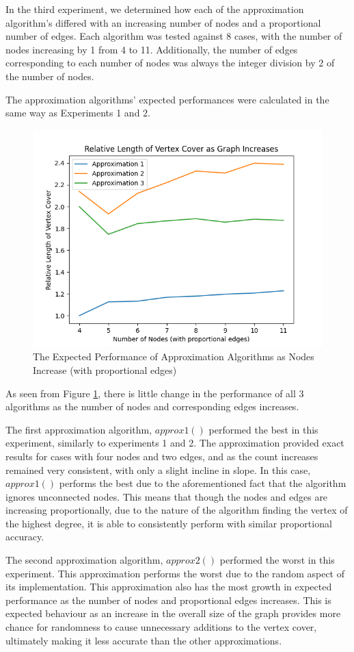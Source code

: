 \documentclass[titlepage]{article}
\begin{document}
In the third experiment, we determined how each of the approximation algorithm's differed with an increasing number of nodes and a proportional number of edges. Each algorithm was tested against 8 cases, with the number of nodes increasing by 1 from 4 to 11. Additionally, the number of edges corresponding to each number of nodes was always the integer division by 2 of the number of nodes.

The approximation algorithms' expected performances were calculated in the same way as Experiments 1 and 2. 

\begin{figure}[H]
    \centering
    \includegraphics[width=0.8\linewidth]{experiment_3_3.png}
    \caption{The Expected Performance of Approximation Algorithms as Nodes Increase (with proportional edges)}
    \label{fig:experiment_3_3}
\end{figure}

As seen from Figure \ref{fig:experiment_3_3}, there is little change in the performance of all 3 algorithms as the number of nodes and corresponding edges increases.

The first approximation algorithm, $approx1()$ performed the best in this experiment, similarly to experiments 1 and 2. The approximation provided exact results for cases with four nodes and two edges, and as the count increases remained very consistent, with only a slight incline in slope. In this case, $approx1()$ performs the best due to the aforementioned fact that the algorithm ignores unconnected nodes. This means that though the nodes and edges are increasing proportionally, due to the nature of the algorithm finding the vertex of the highest degree, it is able to consistently perform with similar proportional accuracy.

The second approximation algorithm, $approx2()$ performed the worst in this experiment. This approximation performs the worst due to the random aspect of its implementation. This approximation also has the most growth in expected performance as the number of nodes and proportional edges increases. This is expected behaviour as an increase in the overall size of the graph provides more chance for randomness to cause unnecessary additions to the vertex cover, ultimately making it less accurate than the other approximations.
\end{document}
